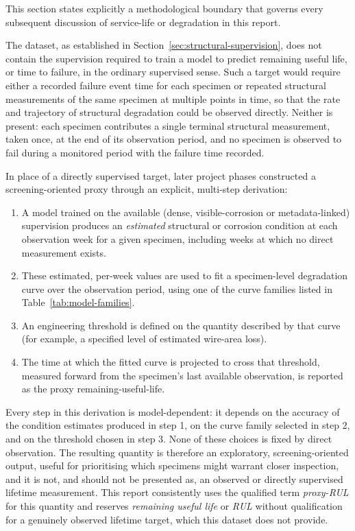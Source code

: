 This section states explicitly a methodological boundary that governs
every subsequent discussion of service-life or degradation in this
report.

The dataset, as established in Section~\ref{sec:structural-supervision},
does not contain the supervision required to train a model to predict
remaining useful life, or time to failure, in the ordinary supervised
sense. Such a target would require either a recorded failure event time
for each specimen or repeated structural measurements of the same
specimen at multiple points in time, so that the rate and trajectory of
structural degradation could be observed directly. Neither is present:
each specimen contributes a single terminal structural measurement, taken
once, at the end of its observation period, and no specimen is observed to
fail during a monitored period with the failure time recorded.

In place of a directly supervised target, later project phases constructed
a screening-oriented proxy through an explicit, multi-step derivation:

\begin{enumerate}
\item A model trained on the available (dense, visible-corrosion or
metadata-linked) supervision produces an \emph{estimated} structural or
corrosion condition at each observation week for a given specimen,
including weeks at which no direct measurement exists.
\item These estimated, per-week values are used to fit a specimen-level
degradation curve over the observation period, using one of the curve
families listed in Table~\ref{tab:model-families}.
\item An engineering threshold is defined on the quantity described by
that curve (for example, a specified level of estimated wire-area loss).
\item The time at which the fitted curve is projected to cross that
threshold, measured forward from the specimen's last available
observation, is reported as the proxy remaining-useful-life.
\end{enumerate}

Every step in this derivation is model-dependent: it depends on the
accuracy of the condition estimates produced in step 1, on the curve
family selected in step 2, and on the threshold chosen in step 3. None of
these choices is fixed by direct observation. The resulting quantity is
therefore an exploratory, screening-oriented output, useful for
prioritising which specimens might warrant closer inspection, and it is
not, and should not be presented as, an observed or directly supervised
lifetime measurement. This report consistently uses the qualified term
\emph{proxy-RUL} for this quantity and reserves \emph{remaining useful
life} or \emph{RUL} without qualification for a genuinely observed
lifetime target, which this dataset does not provide.

